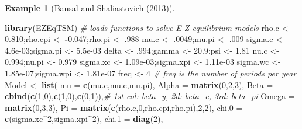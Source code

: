 \documentclass[
  12pt,
]{book}
\newenvironment{Shaded}{\begin{snugshade}}{\end{snugshade}}
\newcommand{\AttributeTok}[1]{\textcolor[rgb]{0.13,0.29,0.53}{#1}}
\newcommand{\CommentTok}[1]{\textcolor[rgb]{0.56,0.35,0.01}{\textit{#1}}}
\newcommand{\DecValTok}[1]{\textcolor[rgb]{0.00,0.00,0.81}{#1}}
\newcommand{\FloatTok}[1]{\textcolor[rgb]{0.00,0.00,0.81}{#1}}
\newcommand{\FunctionTok}[1]{\textcolor[rgb]{0.13,0.29,0.53}{\textbf{#1}}}
\newcommand{\NormalTok}[1]{#1}
\newcommand{\OtherTok}[1]{\textcolor[rgb]{0.56,0.35,0.01}{#1}}
\newcommand{\SpecialCharTok}[1]{\textcolor[rgb]{0.81,0.36,0.00}{\textbf{#1}}}
\theoremstyle{definition}
\theoremstyle{definition}
\newtheorem{example}{Example}[chapter]
\theoremstyle{definition}
\theoremstyle{definition}
\theoremstyle{remark}
\begin{document}
\begin{example}[Bansal and Shaliastovich (2013)]
\begin{Shaded}
\begin{Highlighting}[]
\FunctionTok{library}\NormalTok{(EZEqTSM) }\CommentTok{\# loads functions to solve E{-}Z equilibrium models}
\NormalTok{rho.c }\OtherTok{\textless{}{-}} \FloatTok{0.810}\NormalTok{;rho.cpi }\OtherTok{\textless{}{-}} \SpecialCharTok{{-}}\FloatTok{0.047}\NormalTok{;rho.pi }\OtherTok{\textless{}{-}}\NormalTok{ .}\DecValTok{988}
\NormalTok{mu.c }\OtherTok{\textless{}{-}}\NormalTok{ .}\DecValTok{0049}\NormalTok{;mu.pi }\OtherTok{\textless{}{-}}\NormalTok{ .}\DecValTok{009}
\NormalTok{sigma.c  }\OtherTok{\textless{}{-}} \FloatTok{4.6e{-}03}\NormalTok{;sigma.pi }\OtherTok{\textless{}{-}} \FloatTok{5.5e{-}03}
\NormalTok{delta }\OtherTok{\textless{}{-}}\NormalTok{ .}\DecValTok{994}\NormalTok{;gamma }\OtherTok{\textless{}{-}} \FloatTok{20.9}\NormalTok{;psi }\OtherTok{\textless{}{-}} \FloatTok{1.81}
\NormalTok{nu.c  }\OtherTok{\textless{}{-}} \FloatTok{0.994}\NormalTok{;nu.pi }\OtherTok{\textless{}{-}} \FloatTok{0.979}
\NormalTok{sigma.xc  }\OtherTok{\textless{}{-}} \FloatTok{1.09e{-}03}\NormalTok{;sigma.xpi }\OtherTok{\textless{}{-}} \FloatTok{1.11e{-}03}
\NormalTok{sigma.wc  }\OtherTok{\textless{}{-}} \FloatTok{1.85e{-}07}\NormalTok{;sigma.wpi }\OtherTok{\textless{}{-}} \FloatTok{1.81e{-}07}
\NormalTok{freq }\OtherTok{\textless{}{-}} \DecValTok{4} \CommentTok{\# freq is the number of periods per year}
\NormalTok{Model }\OtherTok{\textless{}{-}} \FunctionTok{list}\NormalTok{(}
  \AttributeTok{mu =} \FunctionTok{c}\NormalTok{(mu.c,mu.c,mu.pi),}
  \AttributeTok{Alpha =} \FunctionTok{matrix}\NormalTok{(}\DecValTok{0}\NormalTok{,}\DecValTok{2}\NormalTok{,}\DecValTok{3}\NormalTok{),}
  \AttributeTok{Beta =} \FunctionTok{cbind}\NormalTok{(}\FunctionTok{c}\NormalTok{(}\DecValTok{1}\NormalTok{,}\DecValTok{0}\NormalTok{),}\FunctionTok{c}\NormalTok{(}\DecValTok{1}\NormalTok{,}\DecValTok{0}\NormalTok{),}\FunctionTok{c}\NormalTok{(}\DecValTok{0}\NormalTok{,}\DecValTok{1}\NormalTok{)),}\CommentTok{\# 1st col: beta\_y, 2d: beta\_c, 3rd: beta\_pi}
  \AttributeTok{Omega =} \FunctionTok{matrix}\NormalTok{(}\DecValTok{0}\NormalTok{,}\DecValTok{3}\NormalTok{,}\DecValTok{3}\NormalTok{),}
  \AttributeTok{Pi =} \FunctionTok{matrix}\NormalTok{(}\FunctionTok{c}\NormalTok{(rho.c,}\DecValTok{0}\NormalTok{,rho.cpi,rho.pi),}\DecValTok{2}\NormalTok{,}\DecValTok{2}\NormalTok{),}
  \AttributeTok{chi.0 =} \FunctionTok{c}\NormalTok{(sigma.xc}\SpecialCharTok{\^{}}\DecValTok{2}\NormalTok{,sigma.xpi}\SpecialCharTok{\^{}}\DecValTok{2}\NormalTok{),}
  \AttributeTok{chi.1 =} \FunctionTok{diag}\NormalTok{(}\DecValTok{2}\NormalTok{),}

\end{Highlighting}
\end{Shaded}
\end{example}
\end{document}
